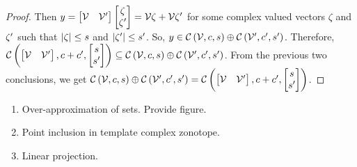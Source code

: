 \begin{proof}
Then $y=\begin{bmatrix}\mathcal{V}
&\mathcal{V}^\prime\end{bmatrix}\begin{bmatrix}\zeta\\ \zeta^\prime\end{bmatrix}=\mathcal{V}\zeta+\mathcal{V}\zeta^\prime$
for some complex valued vectors $\zeta$ and $\zeta^\prime$ such that $\left|\zeta\right|\leq s$ and
$\left|\zeta^\prime\right|\leq s^\prime$.  So,
$y\in\mathit{\mathcal{C}}\left(\mathcal{V},c,s\right)\oplus \mathit{\mathcal{C}}\left(\mathcal{V}^\prime,c^\prime,s^\prime\right)$.
Therefore, $\mathit{\mathcal{C}}\left(\begin{bmatrix}\mathcal{V}
& \mathcal{V}^\prime\end{bmatrix},c+c^\prime,\begin{bmatrix}s\\s^\prime\end{bmatrix}\right) \subseteq \mathit{\mathcal{C}}\left(\mathcal{V},c,s\right)\oplus \mathit{\mathcal{C}}\left(\mathcal{V}^\prime,c^\prime,s^\prime\right)$.
From the previous two conclusions, we get
$\mathit{\mathcal{C}}\left(\mathcal{V},c,s\right)\oplus \mathit{\mathcal{C}}\left(\mathcal{V}^\prime,c^\prime,s^\prime\right)
= \mathit{\mathcal{C}}\left(\begin{bmatrix}\mathcal{V}
& \mathcal{V}^\prime\end{bmatrix},c+c^\prime,\begin{bmatrix}s\\s^\prime\end{bmatrix}\right)$.
\end{proof}
%
{\color{red}
\begin{enumerate}
\item Over-approximation of sets. Provide figure.
\item Point inclusion in template complex zonotope.
\item Linear projection.
\end{enumerate}
}

